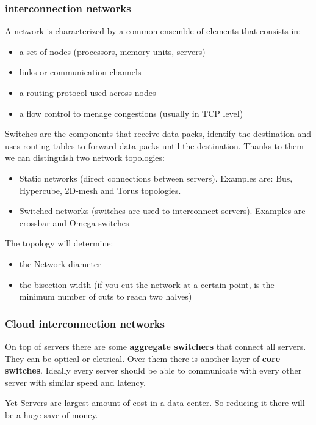         
    \subsubsection{interconnection networks}
        A network is characterized by a common ensemble of elements that consists in:
        \begin{itemize}
            \item a set of nodes (processors, memory units, servers)
            \item links or communication channels
            \item a routing protocol used across nodes
            \item a flow control to menage congestions (usually in TCP level)
        \end{itemize}
        
        Switches are the components that receive data packs, identify the destination and uses routing tables to forward data packs until the destination. Thanks to them we can distinguish two network topologies:
        \begin{itemize}
            \item Static networks (direct connections between servers). Examples are: Bus, Hypercube, 2D-mesh and Torus topologies.
            \item Switched networks (switches are used to interconnect servers). Examples are crossbar and Omega switches
        \end{itemize}
        The topology will determine:
        \begin{itemize}
            \item the Network diameter
            \item the bisection width (if you cut the network at a certain point, is the minimum number of cuts to reach two halves)
        \end{itemize} 

        
    \subsubsection{Cloud interconnection networks}
        On top of servers there are some \textbf{aggregate switchers} that connect all servers. They can be optical or eletrical. Over them there is another layer of \textbf{core switches}.
        Ideally every server should be able to communicate with every other server with similar speed and latency.
        
        Yet Servers are largest amount of cost in a data center. So reducing it there will be a huge save of money.
        
